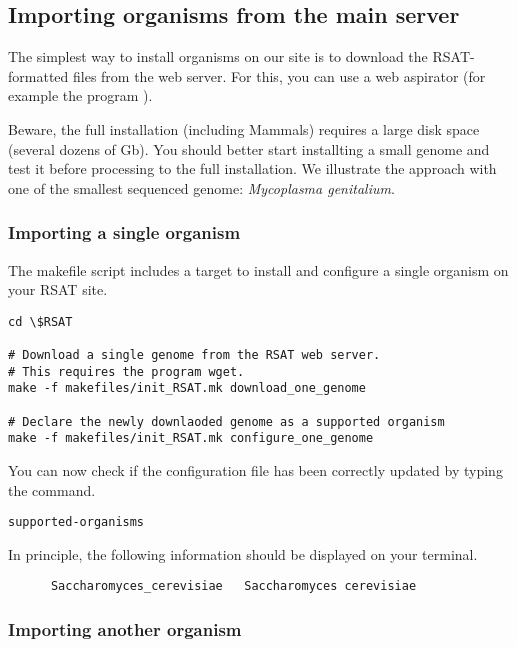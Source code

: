 \subsection{Importing organisms from the \RSAT main server}

The simplest way to install organisms on our \RSAT site is to download
the RSAT-formatted files from the web server. For this, you can use a
web aspirator (for example the program ). 

Beware, the full installation (including Mammals) requires a large
disk space (several dozens of Gb). You should better start installting
a small genome and test it before processing to the full
installation. We illustrate the approach with one of the smallest
sequenced genome: \textit{Mycoplasma genitalium}.

\subsubsection{Importing a single organism}

The makefile script  includes a target to
install and configure a single organism on your RSAT site. 

\begin{small}
\begin{verbatim}
cd \$RSAT

# Download a single genome from the RSAT web server. 
# This requires the program wget.
make -f makefiles/init_RSAT.mk download_one_genome

# Declare the newly downlaoded genome as a supported organism
make -f makefiles/init_RSAT.mk configure_one_genome

\end{verbatim}
\end{small}

You can now check if the configuration file has been correctly updated
by typing the command.

\begin{verbatim}
supported-organisms
\end{verbatim}

In principle, the following information should be displayed on your
terminal.

\begin{verbatim}
      Saccharomyces_cerevisiae   Saccharomyces cerevisiae
\end{verbatim}

\subsubsection{Importing another organism}

